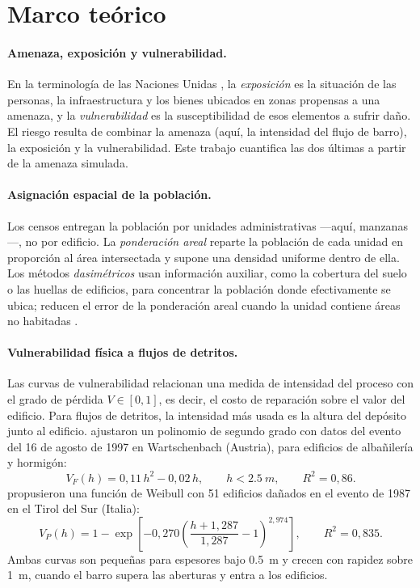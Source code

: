 \documentclass[10pt,a4paper]{article}
\begin{document}
\section{Marco teórico}
\paragraph{Amenaza, exposición y vulnerabilidad.} En la terminología de las Naciones Unidas \citep{undrr2016}, la \emph{exposición} es la situación de las personas, la infraestructura y los bienes ubicados en zonas propensas a una amenaza, y la \emph{vulnerabilidad} es la susceptibilidad de esos elementos a sufrir daño. El riesgo resulta de combinar la amenaza (aquí, la intensidad del flujo de barro), la exposición y la vulnerabilidad. Este trabajo cuantifica las dos últimas a partir de la amenaza simulada.
\paragraph{Asignación espacial de la población.} Los censos entregan la población por unidades administrativas ---aquí, manzanas---, no por edificio. La \emph{ponderación areal} reparte la población de cada unidad en proporción al área intersectada y supone una densidad uniforme dentro de ella. Los métodos \emph{dasimétricos} usan información auxiliar, como la cobertura del suelo o las huellas de edificios, para concentrar la población donde efectivamente se ubica; reducen el error de la ponderación areal cuando la unidad contiene áreas no habitadas \citep{eicher2001,mennis2003}.
\paragraph{Vulnerabilidad física a flujos de detritos.} Las curvas de vulnerabilidad relacionan una medida de intensidad del proceso con el grado de pérdida $V\in[0,1]$, es decir, el costo de reparación sobre el valor del edificio. Para flujos de detritos, la intensidad más usada es la altura del depósito junto al edificio. \citet{fuchs2007} ajustaron un polinomio de segundo grado con datos del evento del 16 de agosto de 1997 en Wartschenbach (Austria), para edificios de albañilería y hormigón:
\begin{equation}
V_F(h)=0{,}11\,h^2-0{,}02\,h,\qquad h<\SI{2,5}{m},\qquad R^2=0{,}86. \label{eq:fuchs}
\end{equation}
\citet{papathoma2012} propusieron una función de Weibull con 51 edificios dañados en el evento de 1987 en el Tirol del Sur (Italia):
\begin{equation}
V_P(h)=1-\exp\!\left[-0{,}270\left(\frac{h+1{,}287}{1{,}287}-1\right)^{2{,}974}\right],\qquad R^2=0{,}835. \label{eq:pk}
\end{equation}
Ambas curvas son pequeñas para espesores bajo \SI{0,5}{m} y crecen con rapidez sobre \SI{1}{m}, cuando el barro supera las aberturas y entra a los edificios.
\end{document}
